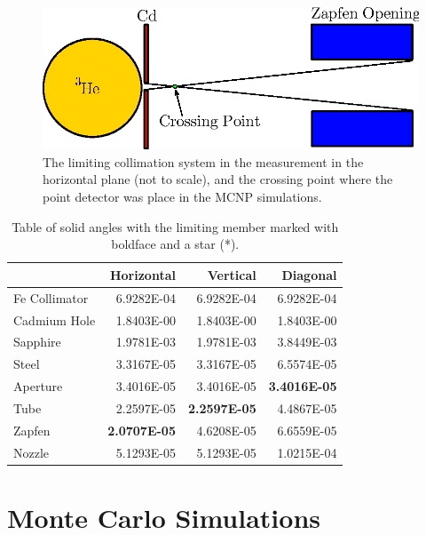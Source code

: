 \documentclass[preprint,12pt]{elsarticle}
\begin{document}
\begin{figure}[h!] 
  \centering
    \includegraphics[width=\textwidth]{graphics/solid_angle.eps}
     \caption{The limiting collimation system in the measurement in the horizontal plane (not to scale), and the crossing point where the point detector was place in the MCNP simulations. \label{fig:solid_angle}}
\end{figure}

\begin{table}
\begin{center}
     \caption{Table of solid angles with the limiting member marked with boldface and a star (*).  \label{tab:sa} }
\begin{tabular}{|l|r|r|r|}
     \hline
                   &     Horizontal  &     Vertical   &     Diagonal   \\
     \hline
     Fe Collimator &     6.9282E-04  &     6.9282E-04 &     6.9282E-04 \\
     \hline 
     Cadmium Hole  &     1.8403E-00  &     1.8403E-00 &     1.8403E-00 \\
     \hline 
     Sapphire      &     1.9781E-03  &     1.9781E-03 &     3.8449E-03 \\
     \hline 
     Steel         &     3.3167E-05  &     3.3167E-05 &     6.5574E-05 \\
     \hline
     Aperture      &     3.4016E-05  &     3.4016E-05 &\bf* 3.4016E-05 \\
     \hline
     Tube          &     2.2597E-05  &\bf* 2.2597E-05 &    4.4867E-05  \\
     \hline
     Zapfen        &\bf* 2.0707E-05  &     4.6208E-05 &     6.6559E-05 \\
     \hline
     Nozzle        &     5.1293E-05  &     5.1293E-05 &     1.0215E-04 \\
     \hline
\end{tabular}
\end{center}
\end{table}


\section{Monte Carlo Simulations}
\label{sec:sim}
\end{document}
